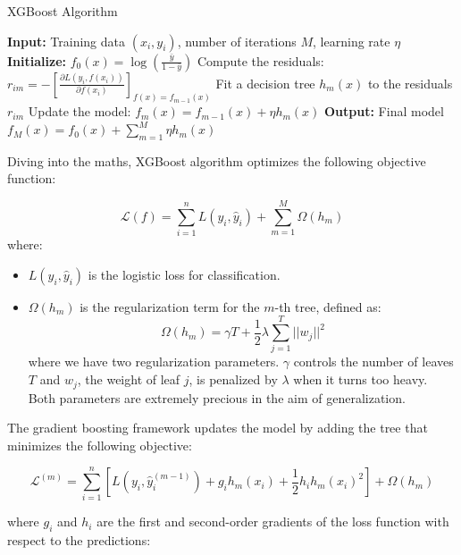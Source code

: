 \documentclass[12pt]{article}
\begin{document}
\begin{algorithm}[H]
\caption{XGBoost Algorithm}
\begin{algorithmic}
\STATE \textbf{Input:} Training data $(x_i, y_i)$, number of iterations $M$, learning rate $\eta$
\STATE \textbf{Initialize:} $f_0(x) = \log ( \frac{\bar{y}}{1 - \bar{y}})$
    \State Compute the residuals: $r_{im} = -\left[ \frac{\partial L(y_i, f(x_i))}{\partial f(x_i)} \right]_{f(x)=f_{m-1}(x)}$ \hfill \break
    \State Fit a decision tree $h_m(x)$ to the residuals $r_{im}$ \hfill \break
    \State Update the model: $f_m(x) = f_{m-1}(x) + \eta h_m(x)$
\ENDFOR
\STATE \textbf{Output:} Final model $f_M(x) = f_0(x) + \sum_{m=1}^{M} \eta h_m(x)$
\end{algorithmic}
\end{algorithm}
\FloatBarrier



\noindent Diving into the maths, XGBoost algorithm optimizes the following objective function:
 
\begin{equation}\label{equa:Gradient Boosting objective function}
\mathcal{L}(f) = \sum_{i=1}^{n} L(y_i, \hat{y}_i) + \sum_{m=1}^{M} \Omega(h_m) 
\end{equation}
where:
\begin{itemize}
    \item $L(y_i, \hat{y}_i)$ is the logistic loss for classification.
    \item $\Omega(h_m)$ is the regularization term for the $m$-th tree, defined as:
    \begin{equation}
    \Omega(h_m) = \gamma T + \frac{1}{2} \lambda \sum_{j=1}^{T} ||w_j||^2
    \end{equation}
    where we have two regularization parameters. $\gamma$ controls the number of leaves $T$ and $w_j$, the weight of leaf $j$, is penalized by $\lambda$ when it turns too heavy. Both parameters are extremely precious in the aim of generalization.
\end{itemize}


\noindent The gradient boosting framework updates the model by adding the tree that minimizes the following objective:
 
\begin{equation}\mathcal{L}^{(m)} = \sum_{i=1}^{n} \left[ L(y_i, \hat{y}_i^{(m-1)}) + g_i h_m(x_i) + \frac{1}{2} h_i h_m(x_i)^2 \right] + \Omega(h_m)
\end{equation}
 
where $g_i$ and $h_i$ are the first and second-order gradients of the loss function with respect to the predictions:
 
\end{document}
